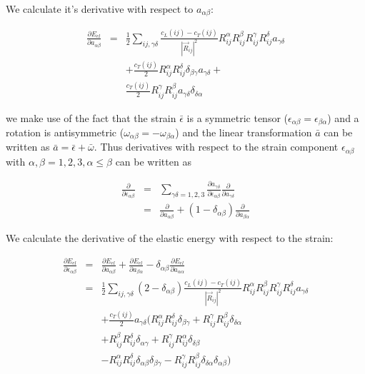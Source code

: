 We calculate it's derivative with respect to $a_{\alpha\beta}$:

\begin{eqnarray}
\frac{\partial E_{el}}{\partial a_{\alpha\beta}}&=& \frac{1}{2}\sum_{ij,\gamma\delta} \frac{c_L(ij)-c_T(ij)}{|\vec R_{ij}|^2} 
R_{ij}^{\alpha}R_{ij}^{\beta}R_{ij}^{\gamma}R_{ij}^{\delta}
a_{\gamma\delta} \nonumber \\
&& +    \frac{c_T(ij)}{2} R_{ij}^{\alpha}R_{ij}^{\delta}
 \delta_{\beta\gamma} a_{\gamma\delta} + \nonumber \\
&& \frac{c_T(ij)}{2} R_{ij}^{\gamma} R_{ij}^{\beta}
a_{\gamma\delta} \delta_{\delta\alpha} 
\end{eqnarray}


we make use of the fact that the strain $\bar \epsilon$ is a symmetric 
tensor ($\epsilon_{\alpha\beta}=\epsilon_{\beta\alpha}$) and a rotation
is antisymmetric ($\omega_{\alpha\beta}=-\omega_{\beta\alpha}$) and 
the linear transformation $\bar a$ can be written as $\bar a=\bar \epsilon + \bar \omega$. Thus
derivatives with respect to the strain component $\epsilon_{\alpha\beta}$ 
with  $\alpha,\beta=1,2,3,\alpha \le \beta$ can be written as

\begin{eqnarray}
\frac{\partial}{\partial \epsilon_{\alpha\beta}}&=&
\sum_{\gamma\delta=1,2,3}\frac{\partial a_{\gamma\delta}}{\partial \epsilon_{\alpha\beta}}
\frac{\partial}{\partial a_{\gamma\delta}} \\
&=&
\frac{\partial}{\partial a_{\alpha\beta}} + (1-\delta_{\alpha\beta})
\frac{\partial}{\partial a_{\beta\alpha}}  
\end{eqnarray}

We calculate the derivative of the elastic energy with respect to the strain:


\begin{eqnarray}\label{Eelderiv}
\frac{\partial E_{el}}{\partial \epsilon_{\alpha\beta}}&=&
\frac{\partial E_{el}}{\partial a_{\alpha\beta}} + \frac{\partial E_{el}}{\partial a_{\beta\alpha}}-\delta_{\alpha\beta}
\frac{\partial E_{el}}{\partial a_{\alpha\alpha}}  \\ 
&=&\frac{1}{2}\sum_{ij,\gamma\delta} (2-\delta_{\alpha\beta})\frac{c_L(ij)-c_T(ij)}{|\vec R_{ij}|^2} 
R_{ij}^{\alpha}R_{ij}^{\beta}R_{ij}^{\gamma}R_{ij}^{\delta} 
a_{\gamma\delta} \nonumber \\
& & +    \frac{c_T(ij)}{2} a_{\gamma\delta} ( R_{ij}^{\alpha}R_{ij}^{\delta}
 \delta_{\beta\gamma}  +   R_{ij}^{\gamma} R_{ij}^{\beta}
\delta_{\delta\alpha}  \nonumber \\
&& +    R_{ij}^{\beta} R_{ij}^{\delta}
 \delta_{\alpha\gamma}  +   R_{ij}^{\gamma}R_{ij}^{\alpha}
 \delta_{\delta\beta} \nonumber \\
& & -    R_{ij}^{\alpha}R_{ij}^{\delta}
 \delta_{\alpha\beta}\delta_{\beta\gamma}    -  R_{ij}^{\gamma} R_{ij}^{\beta}
 \delta_{\delta\alpha} \delta_{\alpha\beta} ) \nonumber
\end{eqnarray}



